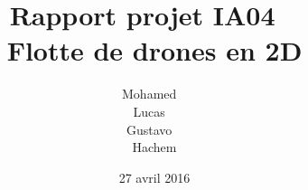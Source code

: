 \documentclass[11pt]{report}
\title{Rapport projet IA04 ~\\ Flotte de drones en 2D}
\author
{
	Mohamed \bsc{Baaziz} ~\\ 
	Lucas \bsc{Sorin} ~\\ 
	Gustavo \bsc{Cabrera} ~\\ 
	Hachem \bsc{Benyahia}
}
\date{27 avril 2016}
\begin{document}
\maketitle

\renewcommand{\contentsname}{\centering Sommaire \vspace*{2 cm}}
\tableofcontents

\newpage
\end{document}
